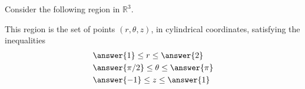 \documentclass{ximera}
\begin{document}
\begin{problem}
Consider the following region in $\mathbb{R}^3$.

\begin{image}
\end{image}

This region is the set of points $(r, \theta, z)$, in cylindrical coordinates, satisfying the inequalities
\begin{align*}
&\answer{1}\leq r\leq \answer{2}\\
&\answer{\pi/2}\leq\theta\leq\answer{\pi}\\
&\answer{-1}\leq z\leq\answer{1}
\end{align*}

\end{problem}
\end{document}
